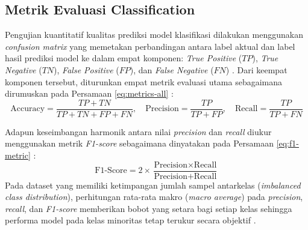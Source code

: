 \documentclass[a4paper,oneside,11pt]{book}
\begin{document}
\subsection{Metrik Evaluasi Classification}
\par Pengujian kuantitatif kualitas prediksi model klasifikasi dilakukan menggunakan \textit{confusion matrix} yang memetakan perbandingan antara label aktual dan label hasil prediksi model ke dalam empat komponen: \textit{True Positive} ($TP$), \textit{True Negative} ($TN$), \textit{False Positive} ($FP$), dan \textit{False Negative} ($FN$) \cite{trivusi_confusion_matrix, fawcett2006introduction}. Dari keempat komponen tersebut, diturunkan empat metrik evaluasi utama sebagaimana dirumuskan pada Persamaan \eqref{eq:metrics-all} \cite{scikit_metrics, dqlab_classification_metrics}:
\begin{equation}
  \text{Accuracy} = \frac{TP + TN}{TP + TN + FP + FN}, \quad
  \text{Precision} = \frac{TP}{TP + FP}, \quad
  \text{Recall} = \frac{TP}{TP + FN}
  \label{eq:metrics-all}
\end{equation}
\par Adapun keseimbangan harmonik antara nilai \textit{precision} dan \textit{recall} diukur menggunakan metrik \textit{F1-score} sebagaimana dinyatakan pada Persamaan \eqref{eq:f1-metric} \cite{normawati2021implementasi, dqlab_classification_metrics}:
\begin{equation}
  \text{F1-Score} = 2 \times \frac{\text{Precision} \times \text{Recall}}{\text{Precision} + \text{Recall}}
  \label{eq:f1-metric}
\end{equation}
Pada dataset yang memiliki ketimpangan jumlah sampel antarkelas (\textit{imbalanced class distribution}), perhitungan rata-rata makro (\textit{macro average}) pada \textit{precision}, \textit{recall}, dan \textit{F1-score} memberikan bobot yang setara bagi setiap kelas sehingga performa model pada kelas minoritas tetap terukur secara objektif \cite{scikit_metrics, fawcett2006introduction}.
\end{document}
